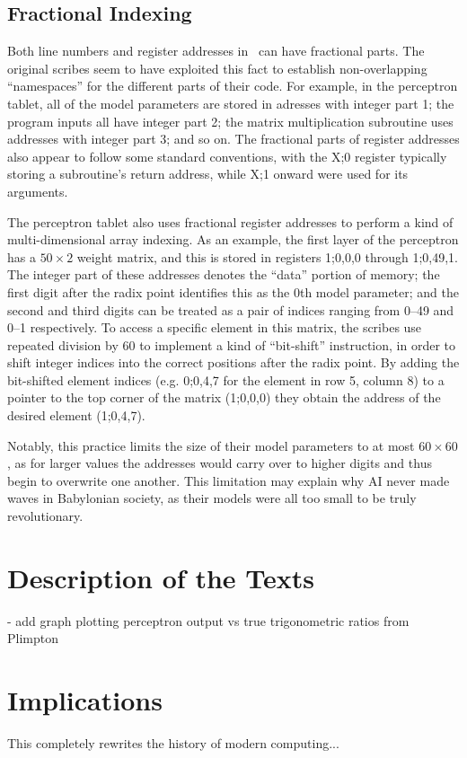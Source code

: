 \documentclass[11pt]{article}
\newcommand{\emeszida}{\textcuneiform{𒅴𒋃𒀀}}
\begin{document}
\subsection{Fractional Indexing}
Both line numbers and register addresses in \emeszida\ can have fractional parts.
The original scribes seem to have exploited this fact to establish non-overlapping ``namespaces'' for the different parts of their code. 
For example, in the perceptron tablet, all of the model parameters are stored in adresses with integer part 1; the program inputs all have integer part 2; the matrix multiplication subroutine uses addresses with integer part 3; and so on.
The fractional parts of register addresses also appear to follow some standard conventions, with the X;0 register typically storing a subroutine's return address, while X;1 onward were used for its arguments.

The perceptron tablet also uses fractional register addresses to perform a kind of multi-dimensional array indexing.
As an example, the first layer of the perceptron has a $50\times 2$ weight matrix, and this is stored in registers 1;0,0,0 through 1;0,49,1. The integer part of these addresses denotes the ``data'' portion of memory; the first digit after the radix point identifies this as the 0th model parameter; and the second and third digits can be treated as a pair of indices ranging from 0--49 and 0--1 respectively.
To access a specific element in this matrix, the scribes use repeated division by 60 to implement a kind of ``bit-shift'' instruction, in order to shift integer indices into the correct positions after the radix point. 
By adding the bit-shifted element indices (e.g. 0;0,4,7 for the element in row 5, column 8) to a pointer to the top corner of the matrix (1;0,0,0) they obtain the address of the desired element (1;0,4,7).

Notably, this practice limits the size of their model parameters to at most $60\times 60$, as for larger values the addresses would carry over to higher digits and thus begin to overwrite one another. 
This limitation may explain why AI never made waves in Babylonian society, as their models were all too small to be truly revolutionary.


\section{Description of the Texts}
- add graph plotting perceptron output vs true trigonometric ratios from Plimpton

\section{Implications}
This completely rewrites the history of modern computing... 
\end{document}

